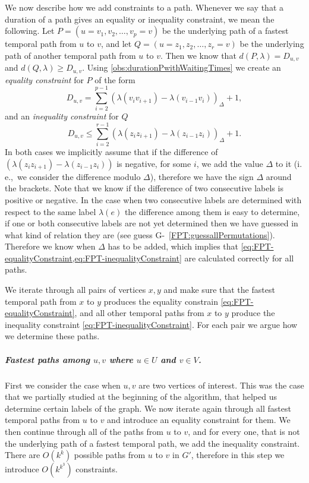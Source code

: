 \documentclass[a4paper,UKenglish,cleveref, autoref, thm-restate]{lipics-v2021}
\newcommand{\ie}{i.\,e.,\ }
\begin{document}
We now describe how we add constraints to a path. Whenever we say that a duration of a path gives an equality or inequality constraint, we mean the following.
Let $P=(u=v_1,v_2, \dots, v_p = v)$ be the underlying path of a fastest temporal path from $u$ to $v$,
and let $Q = (u=z_1,z_2, \dots, z_r = v)$ be the underlying path of another temporal path from $u$ to $v$.
Then we know that $d(P,\lambda) = D_{u,v}$ and $d(Q, \lambda) \geq D_{u,v}$.
Using \cref{obs:durationPwithWaitingTimes}
we create an \emph{equality constraint} for $P$
of the form 
\begin{equation}\label{eq:FPT-equalityConstraint}
    D_{u,v} = \sum _ {i=2} ^ {p-1} (\lambda (v_{i}v_{i+1}) - \lambda (v_{i-1}v_i))_\Delta + 1,
\end{equation}
and an \emph{inequality constraint} for $Q$ 
\begin{equation}\label{eq:FPT-inequalityConstraint}
    D_{u,v} \leq \sum _ {i=2} ^ {r-1} (\lambda (z_{i}z_{i+1}) - \lambda (z_{i-1}z_i))_\Delta + 1.
\end{equation}
In both cases we implicitly assume that if the difference of $(\lambda (z_{i}z_{i+1}) - \lambda (z_{i-1}z_i))$ is negative, for some $i$, we add the value $\Delta$ to it (\ie we consider the difference modulo $\Delta$), therefore we have the sign $\Delta$ around the brackets.
Note that we know if the difference of two consecutive labels is positive or negative. 
In the case when two consecutive labels are determined with respect to the same label $\lambda(e)$ the difference among them is easy to determine,
if one or both consecutive labels are not yet determined 
then we have guessed in what kind of relation they are (see guess G-~\ref{FPT:guessallPermutations}).
Therefore we know when $\Delta$ has to be added, which implies that \cref{eq:FPT-equalityConstraint,eq:FPT-inequalityConstraint} are calculated correctly for all paths.

We iterate through all pairs of vertices $x,y$ and make sure that the fastest temporal path from $x$ to $y$ produces the equality constrain \cref{eq:FPT-equalityConstraint},
and all other temporal paths from $x$ to $y$ produce the inequality constraint \cref{eq:FPT-inequalityConstraint}.
For each pair we argue how we determine these paths.

\subparagraph{\boldmath Fastest paths among $u,v$ where $u \in U$ and $v \in V$.}
First we consider the case when $u,v$ are two vertices of interest.
This was the case that we partially studied at the beginning of the algorithm, that helped us determine certain labels of the graph.
We now iterate again through all fastest temporal paths from $u$ to $v$ and introduce an equality constraint for them.
We then continue 
through all of the paths from $u$ to $v$, and for every one, that is not the underlying path of a fastest temporal path, we add the inequality constraint.
There are $O(k^k)$ possible paths from $u$ to $v$ in $G'$, therefore in this step we introduce $O(k^{k^3})$ constraints.
\end{document}
